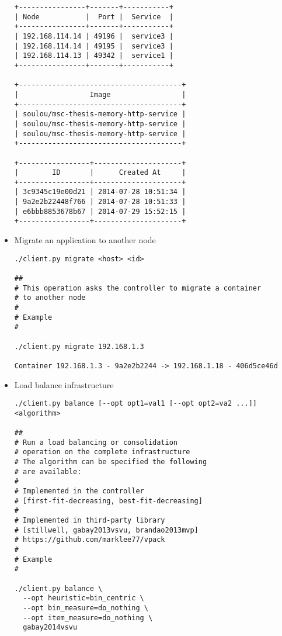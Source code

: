 \begin{itemize}
{\begin{lstlisting}
+----------------+-------+-----------+
| Node           |  Port |  Service  |
+----------------+-------+-----------+
| 192.168.114.14 | 49196 |  service3 |
| 192.168.114.14 | 49195 |  service3 |
| 192.168.114.13 | 49342 |  service1 |
+----------------+-------+-----------+

+---------------------------------------+
|                 Image                 |
+---------------------------------------+
| soulou/msc-thesis-memory-http-service |
| soulou/msc-thesis-memory-http-service |
| soulou/msc-thesis-memory-http-service |
+---------------------------------------+

+-----------------+---------------------+
|        ID       |      Created At     |
+-----------------+---------------------+
| 3c9345c19e00d21 | 2014-07-28 10:51:34 |
| 9a2e2b22448f766 | 2014-07-28 10:51:33 |
| e6bbb8853678b67 | 2014-07-29 15:52:15 |
+-----------------+---------------------+
\end{lstlisting}}
\item{Migrate an application to another node
\begin{lstlisting}
./client.py migrate <host> <id>

##
# This operation asks the controller to migrate a container
# to another node
#
# Example
#

./client.py migrate 192.168.1.3

Container 192.168.1.3 - 9a2e2b2244 -> 192.168.1.18 - 406d5ce46d
\end{lstlisting}}
\item{Load balance infrastructure
\begin{lstlisting}
./client.py balance [--opt opt1=val1 [--opt opt2=va2 ...]] <algorithm>

##
# Run a load balancing or consolidation
# operation on the complete infrastructure
# The algorithm can be specified the following
# are available:
#
# Implemented in the controller
# [first-fit-decreasing, best-fit-decreasing]
#
# Implemented in third-party library
# [stillwell, gabay2013vsvu, brandao2013mvp]
# https://github.com/marklee77/vpack
#
# Example
#

./client.py balance \
  --opt heuristic=bin_centric \
  --opt bin_measure=do_nothing \
  --opt item_measure=do_nothing \
  gabay2014vsvu


\end{lstlisting}}
\end{itemize}
